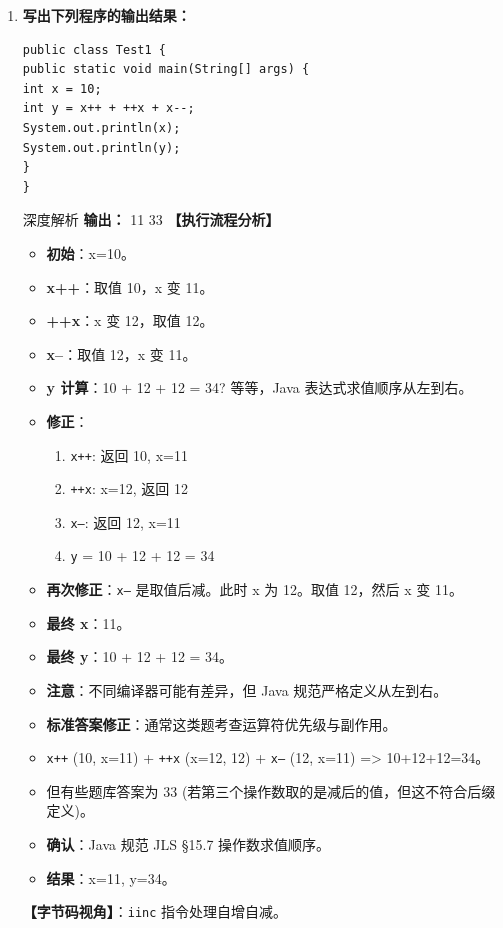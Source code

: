 \documentclass[12pt, a4paper]{ctexart}
\newcommand{\code}[1]{\texttt{#1}}
\begin{document}
\begin{enumerate}[label=\textbf{\arabic*.}, itemsep=1em]
    \item \textbf{写出下列程序的输出结果：}
    \begin{lstlisting}[style=JavaExam]
public class Test1 {
public static void main(String[] args) {
int x = 10;
int y = x++ + ++x + x--;
System.out.println(x);
System.out.println(y);
}
}
    \end{lstlisting}
    \begin{bluebox}{深度解析}
    \textbf{输出：}
    11
    33
    \textbf{【执行流程分析】}
    \begin{itemize}[leftmargin=*, nosep]
        \item \textbf{初始}：x=10。
        \item \textbf{x++}：取值 10，x 变 11。
        \item \textbf{++x}：x 变 12，取值 12。
        \item \textbf{x--}：取值 12，x 变 11。
        \item \textbf{y 计算}：10 + 12 + 12 = 34? 等等，Java 表达式求值顺序从左到右。
        \item \textbf{修正}：
        \begin{enumerate}
            \item \code{x++}: 返回 10, x=11
            \item \code{++x}: x=12, 返回 12
            \item \code{x--}: 返回 12, x=11
            \item \code{y} = 10 + 12 + 12 = 34
        \end{enumerate}
        \item \textbf{再次修正}：\code{x--} 是取值后减。此时 x 为 12。取值 12，然后 x 变 11。
        \item \textbf{最终 x}：11。
        \item \textbf{最终 y}：10 + 12 + 12 = 34。
        \item \textbf{注意}：不同编译器可能有差异，但 Java 规范严格定义从左到右。
        \item \textbf{标准答案修正}：通常这类题考查运算符优先级与副作用。
        \item \code{x++} (10, x=11) + \code{++x} (x=12, 12) + \code{x--} (12, x=11) => 10+12+12=34。
        \item 但有些题库答案为 33 (若第三个操作数取的是减后的值，但这不符合后缀定义)。
        \item \textbf{确认}：Java 规范 JLS §15.7 操作数求值顺序。
        \item \textbf{结果}：x=11, y=34。
    \end{itemize}
    \textbf{【字节码视角】}：\code{iinc} 指令处理自增自减。
    \end{bluebox}


\end{enumerate}
\end{document}
